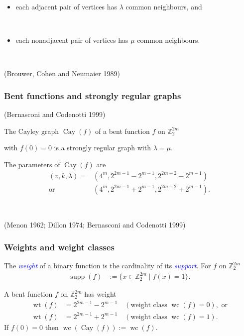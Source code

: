 \documentclass[pdf,sprung,slideColor,nocolorBG]{beamer}
\newenvironment{colortheme}[1]{
\def\ProvidesPackageRCS $##1${\relax}
\renewcommand{\ProcessOptions}{\relax}
\makeatletter

\makeatother
}{}
\newcommand{\slidecite}[1]{\tiny{(#1)}\normalsize{}}
\newcommand{\smallcite}[1]{\small{(#1)}\normalsize{}}
\newcommand{\mb}[1]{\mathbb{#1}}
\newcommand{\Emph}[1]{\emph{\textcolor{blue}{#1}}}
\newcommand{\Cay}[1]{\operatorname{Cay}\left(#1\right)}
\newcommand{\support}[1]{\operatorname{supp}\left(#1\right)}
\newcommand{\weight}[1]{\operatorname{wt}\left(#1\right)}
\newcommand{\weightclass}[1]{\operatorname{wc}\left(#1\right)}
\newcommand{\Z}{\mb{Z}}
\begin{document}
\begin{colortheme}{seagull}
\begin{frame}
\begin{itemize}
~
 \item 
each adjacent pair of vertices has $\lambda$ common neighbours, and

~
\item
each nonadjacent pair of vertices has $\mu$ common neighbours.
\end{itemize}

~

\slidecite{Brouwer, Cohen and Neumaier 1989}

\end{frame}

\begin{frame}
\frametitle{Bent functions and strongly regular graphs}

\begin{Theorem}
\smallcite{Bernasconi and Codenotti 1999}

The Cayley graph $\Cay{f}$ of a bent function $f$ on $\Z_2^{2m}$ 

with $f(0)=0$ is a strongly regular graph with $\lambda = \mu.$ 
\end{Theorem}

The parameters of $\Cay{f}$ are
\begin{align*}
(v,k,\lambda) = &(4^m, 2^{2 m - 1} - 2^{m-1}, 2^{2 m - 2} - 2^{m-1}) 
\\
  \text{or} \quad &(4^m, 2^{2 m - 1} + 2^{m-1}, 2^{2 m - 2} + 2^{m-1}).
\end{align*}

~

\slidecite{Menon 1962; Dillon 1974; Bernasconi and Codenotti 1999}
\end{frame}
\end{colortheme}
\begin{colortheme}{jubata}
\begin{frame}
\frametitle{Weights and weight classes}
\begin{Definition}
The \Emph{weight} of a binary function is the cardinality of its \Emph{support}.
For $f$ on $\Z_2^{2m}$
\begin{align*}
\support{f} &:= \{x \in \Z_2^{2m} \mid f(x)=1 \}.  
\end{align*}

A bent function $f$ on $\Z_2^{2m}$ has weight
\begin{align*}
\weight{f} &= 2^{2 m - 1} - 2^{m-1} \quad (\text{weight class~} \weightclass{f}=0), \text{~or}
\\
\weight{f} &= 2^{2 m - 1} + 2^{m-1} \quad (\text{weight class~} \weightclass{f}=1).
\end{align*}
If $f(0)=0$ then $\weightclass{\Cay{f}} := \weightclass{f}$.
\end{Definition}
\end{frame}
\end{colortheme}
\end{document}
